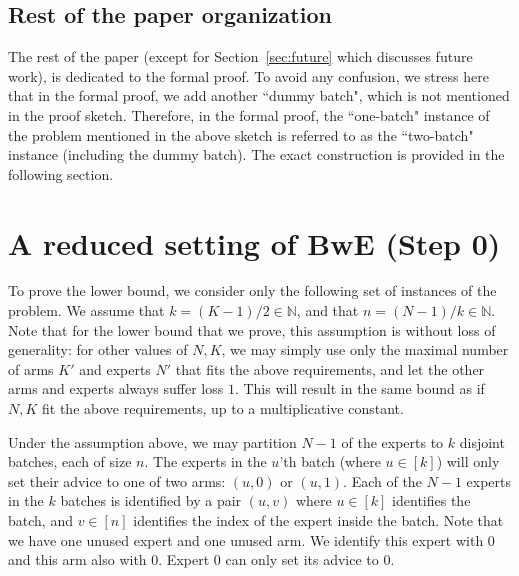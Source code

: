 \documentclass[a4paper,11pt]{article}
\theoremstyle{definition}
\begin{document}

\subsection{Rest of the paper organization}
The rest of the paper (except for Section~\ref{sec:future} which discusses future work), is dedicated to the formal proof. To avoid any confusion, we stress here that in the formal proof, we add another ``dummy batch", which is not mentioned in the proof sketch. Therefore, in the formal proof, the ``one-batch" instance of the problem mentioned in the above sketch is referred to as the ``two-batch" instance (including the dummy batch). The exact construction is provided in the following section.


\section{A reduced setting of BwE (Step 0)} \label{sec:restricted-step0}
To prove the lower bound, we consider only the following set of instances of the problem. We assume that $k= (K-1)/2 \in \mathbb{N}$, and that $n=(N-1)/k \in \mathbb{N}$. Note that for the lower bound that we prove, this assumption is without loss of generality: for other values of $N,K$, we may simply use only the maximal number of arms $K'$ and experts $N'$ that fits the above requirements, and let the other arms and experts always suffer loss $1$. This will result in the same bound as if $N,K$ fit the above requirements, up to a multiplicative constant.

Under the assumption above, we may partition $N-1$ of the experts to $k$ disjoint batches, each of size $n$. The experts in the $u$'th batch (where $u \in [k]$) will only set their advice to one of two arms: $(u,0)$ or $(u,1)$. Each of the $N-1$ experts in the $k$ batches is identified by a pair $(u,v)$ where $u\in[k]$ identifies the batch, and $v \in [n]$ identifies the index of the expert inside the batch. Note that we have one unused expert and one unused arm. We identify this expert with $0$ and this arm also with $0$. Expert $0$ can only set its advice to $0$.
\end{document}
